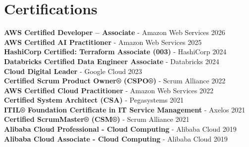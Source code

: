 \section{Certifications}
\begin{itemize}[leftmargin=0.15in, label={}]
    \small{\item{
        \textbf{AWS Certified Developer – Associate} - Amazon Web Services \hfill 2026 \\
        \textbf{AWS Certified AI Practitioner} - Amazon Web Services \hfill 2025 \\
        \textbf{HashiCorp Certified: Terraform Associate (003)} - HashiCorp \hfill 2024 \\
        \textbf{Databricks Certified Data Engineer Associate} - Databricks \hfill 2024 \\
        \textbf{Cloud Digital Leader} - Google Cloud \hfill 2023 \\
        \textbf{Certified Scrum Product Owner® (CSPO®)} - Scrum Alliance \hfill 2022 \\
        \textbf{AWS Certified Cloud Practitioner} - Amazon Web Services \hfill 2022 \\
        \textbf{Certified System Architect (CSA)} - Pegasystems \hfill 2021 \\
        \textbf{ITIL® Foundation Certificate in IT Service Management} - Axelos \hfill 2021 \\
        \textbf{Certified ScrumMaster® (CSM®)} - Scrum Alliance \hfill 2021 \\
        \textbf{Alibaba Cloud Professional - Cloud Computing} - Alibaba Cloud \hfill 2019 \\
        \textbf{Alibaba Cloud Associate - Cloud Computing} - Alibaba Cloud \hfill 2019 \\
    }}
\end{itemize}